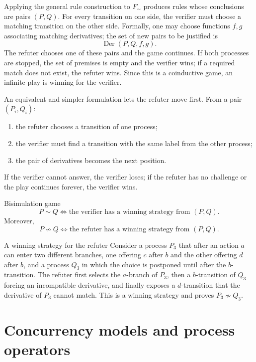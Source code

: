 \documentclass[a4paper]{article}
\newcommand{\Der}{\operatorname{Der}}
\begin{document}
Applying the general rule construction to \(F_{\sim}\) produces rules whose conclusions are pairs \((P,Q)\).
For every transition on one side, the verifier must choose a matching transition on the other side.
Formally, one may choose functions \(f,g\) associating matching derivatives; the set of new pairs to be justified is
\[
    \Der(P,Q,f,g).
\]
The refuter chooses one of these pairs and the game continues.
If both processes are stopped, the set of premises is empty and the verifier wins; if a required match does not exist, the refuter wins.
Since this is a coinductive game, an infinite play is winning for the verifier.

An equivalent and simpler formulation lets the refuter move first.
From a pair \((P_i,Q_i)\):
\begin{enumerate}
    \item the refuter chooses a transition of one process;
    \item the verifier must find a transition with the same label from the other process;
    \item the pair of derivatives becomes the next position.
\end{enumerate}
If the verifier cannot answer, the verifier loses; if the refuter has no challenge or the play continues forever, the verifier wins.

\begin{snippettheorem}{Bisimulation game}
    \[
        P\sim Q
        \iff
        \text{the verifier has a winning strategy from \((P,Q)\)}.
    \]
    Moreover,
    \[
        P\not\sim Q
        \iff
        \text{the refuter has a winning strategy from \((P,Q)\)}.
    \]
\end{snippettheorem}

\begin{snippetexample}{A winning strategy for the refuter}
    Consider a process \(P_3\) that after an action \(a\) can enter two different branches, one offering \(c\) after \(b\) and the other offering \(d\) after \(b\), and a process \(Q_3\) in which the choice is postponed until after the \(b\)-transition.
    The refuter first selects the \(a\)-branch of \(P_3\), then a \(b\)-transition of \(Q_3\) forcing an incompatible derivative, and finally exposes a \(d\)-transition that the derivative of \(P_3\) cannot match.
    This is a winning strategy and proves \(P_3\not\sim Q_3\).
\end{snippetexample}

\pagebreak
\part{Concurrency models and process operators}
\end{document}
